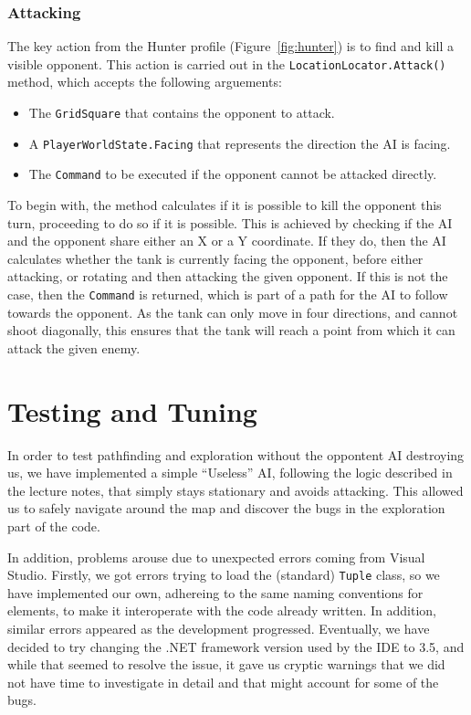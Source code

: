 \documentclass[11pt]{article}
\begin{document}
\subsubsection{Attacking}

The key action from the Hunter profile (Figure~\ref{fig:hunter}) is to find and kill a visible opponent. This action is carried out in the \verb|LocationLocator.Attack()| method, which accepts the following arguements:
\begin{itemize}
\item The \verb|GridSquare| that contains the opponent to attack.
\item A \verb|PlayerWorldState.Facing| that represents the direction the AI is facing.
\item The \verb|Command| to be executed if the opponent cannot be attacked directly.
\end{itemize}

To begin with, the method calculates if it is possible to kill the opponent this turn, proceeding to do so if it is possible. This is achieved by checking if the AI and the opponent share either an X or a Y coordinate. If they do, then the AI calculates whether the tank is currently facing the opponent, before either attacking, or rotating and then attacking the given opponent. If this is not the case, then the \verb|Command| is returned, which is part of a path for the AI to follow towards the opponent. As the tank can only move in four directions, and cannot shoot diagonally, this ensures that the tank will reach a point from which it can attack the given enemy.

\section{Testing and Tuning} \label{sec:testing}

In order to test pathfinding and exploration without the oppontent AI destroying us, we have implemented a simple ``Useless'' AI, following the logic described in the lecture notes, that simply stays stationary and avoids attacking. This allowed us to safely navigate around the map and discover the bugs in the exploration part of the code.

In addition, problems arouse due to unexpected errors coming from Visual Studio. Firstly, we got errors trying to load the (standard) \verb|Tuple| class, so we have implemented our own, adhereing to the same naming conventions for elements\cite{cSharpTuple}, to make it interoperate with the code already written. In addition, similar errors appeared as the development progressed. Eventually, we have decided to try changing the .NET framework version used by the IDE to 3.5, and while that seemed to resolve the issue, it gave us cryptic warnings that we did not have time to investigate in detail and that might account for some of the bugs.
\end{document}
